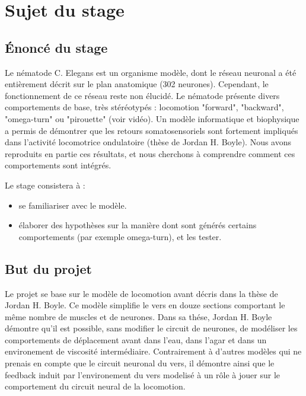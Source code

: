 \chapter{Sujet du stage} %
\label{cha:Sujet du stage}

\section{Énoncé du stage} %
\label{sec:Énoncé du stage}

Le nématode C. Elegans est un organisme modèle, dont le réseau neuronal a été entièrement décrit sur le plan
anatomique (302 neurones). Cependant, le fonctionnement de ce réseau reste non élucidé. Le nématode présente
divers comportements de base, très stéréotypés : locomotion "forward", "backward", "omega-turn" ou "pirouette"
(voir vidéo). Un modèle informatique et biophysique a permis de démontrer que les retours somatosensoriels
sont fortement impliqués dans l’activité locomotrice ondulatoire (thèse de Jordan H. Boyle). Nous avons
reproduits en partie ces résultats, et nous cherchons à comprendre comment ces comportements sont intégrés.

Le stage consistera à :
\begin{itemize}
   \item se familiariser avec le modèle.
   \item élaborer des hypothèses sur la manière dont sont générés certains comportements (par exemple
      omega-turn), et les tester.
\end{itemize}


\section{But du projet} %
\label{sec:But du projet}

Le projet se base sur le modèle de locomotion avant décris dans la thèse de Jordan H. Boyle\cite{Boyle2009}.
Ce modèle simplifie le vers en douze sections comportant le même nombre de muscles et de neurones.
Dans sa thése, Jordan H. Boyle démontre qu'il est possible, sans modifier le circuit de neurones, de
modéliser les comportements de déplacement avant dans l'eau, dans l'agar et dans un environement
de viscosité intermédiaire. Contrairement à d'autres modèles qui ne prenais en compte que le circuit neuronal
du vers, il démontre ainsi que le feedback induit par l'environement du vers modelisé à un rôle à jouer sur le
comportement du circuit neural de la locomotion.

